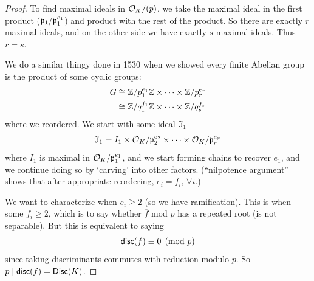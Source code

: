 \begin{proof}
    To find maximal ideals in $\mathcal{O}_K/(p)$, we take the maximal ideal in the first product ($\mathfrak{p}_1 / \mathfrak{p}_1^{e_1}$) and product with the rest of the product. So there are exactly $r$ maximal ideals, and on the other side we have exactly $s$ maximal ideals. Thus $r = s$.

    We do a similar thingy done in 1530 when we showed every finite Abelian group is the product of some cyclic groups:
    \begin{align*}
        G & \cong \mathbb Z/p_1^{e_1}\mathbb Z \times \cdots \times \mathbb Z/p_r^{e_r} \\
          & \cong \mathbb Z/q_1^{f_1}\mathbb Z \times \cdots \times \mathbb Z/q_s^{f_s}
    \end{align*}
    where we reordered. We start with some ideal $\mathfrak{I}_1$
    \[\mathfrak{I}_1 = I_1\times \mathcal{O}_K/\mathfrak{p}_2^{e_2}\times \cdots \times \mathcal{O}_K/\mathfrak{p}_r^{e_r}\]
    where $I_1$ is maximal in $\mathcal{O}_K/\mathfrak{p}_1^{e_1}$, and we start forming chains to recover $e_1$, and we continue doing so by `carving' into other factors. (``nilpotence argument'' shows that after appropriate reordering, $e_i = f_i$, $\forall i$.)

    We want to characterize when $e_i\geq 2$ (so we have ramification). This is when some $f_i\geq 2$, which is to say whether $\overline{f}$ mod $p$ has a repeated root (is not separable). But this is equivalent to saying
    \[\operatorname{\mathsf{disc}}(f)\equiv 0\pmod{p}\]
    since taking discriminants commutes with reduction modulo $p$. So $p\mid \operatorname{\mathsf{disc}}(f) = \operatorname{\mathsf{Disc}}(K)$.
\end{proof}